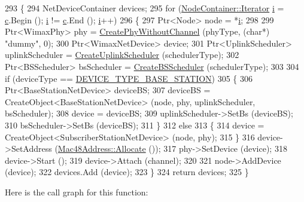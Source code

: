 \begin{DoxyCode}
293 \{
294   NetDeviceContainer devices;
295   \textcolor{keywordflow}{for} (\hyperlink{classns3_1_1NodeContainer_aa1a9f2d2b09bfef7d066d3974bca2cc4}{NodeContainer::Iterator} \hyperlink{bernuolliDistribution_8m_a6f6ccfcf58b31cb6412107d9d5281426}{i} = \hyperlink{lte_2model_2fading-traces_2fading__trace__generator_8m_ae0323a9039add2978bf5b49550572c7c}{c}.Begin (); \hyperlink{bernuolliDistribution_8m_a6f6ccfcf58b31cb6412107d9d5281426}{i} != \hyperlink{lte_2model_2fading-traces_2fading__trace__generator_8m_ae0323a9039add2978bf5b49550572c7c}{c}.End (); 
      \hyperlink{bernuolliDistribution_8m_a6f6ccfcf58b31cb6412107d9d5281426}{i}++)
296     \{
297       Ptr<Node> node = *\hyperlink{bernuolliDistribution_8m_a6f6ccfcf58b31cb6412107d9d5281426}{i};
298 
299       Ptr<WimaxPhy> phy = \hyperlink{classns3_1_1WimaxHelper_a2df0761a458376b6e2e1ad4ebb471697}{CreatePhyWithoutChannel} (phyType, (\textcolor{keywordtype}{char}*) \textcolor{stringliteral}{"dummy"}, 0);
300       Ptr<WimaxNetDevice> device;
301       Ptr<UplinkScheduler> uplinkScheduler = \hyperlink{classns3_1_1WimaxHelper_a3b237b459ffd98a13d71612d985f9e90}{CreateUplinkScheduler} (schedulerType);
302       Ptr<BSScheduler> bsScheduler = \hyperlink{classns3_1_1WimaxHelper_a583fc7ce6463c687092e9ef8d03413af}{CreateBSScheduler} (schedulerType);
303 
304       \textcolor{keywordflow}{if} (deviceType == \hyperlink{classns3_1_1WimaxHelper_a2c8fd9211cf4d7605e506b7c983d78fca96e5d9ff34a8a0da1262f37e83abc43b}{DEVICE\_TYPE\_BASE\_STATION})
305         \{
306           Ptr<BaseStationNetDevice> deviceBS;
307           deviceBS = CreateObject<BaseStationNetDevice> (node, phy, uplinkScheduler, bsScheduler);
308           device = deviceBS;
309           uplinkScheduler->SetBs (deviceBS);
310           bsScheduler->SetBs (deviceBS);
311         \}
312       \textcolor{keywordflow}{else}
313         \{
314           device = CreateObject<SubscriberStationNetDevice> (node, phy);
315         \}
316       device->SetAddress (\hyperlink{classns3_1_1Mac48Address_a203b53c035649c0d4881fa1115aa2cdb}{Mac48Address::Allocate} ());
317       phy->SetDevice (device);
318       device->Start ();
319       device->Attach (channel);
320 
321       node->AddDevice (device);
322       devices.Add (device);
323     \}
324   \textcolor{keywordflow}{return} devices;
325 \}
\end{DoxyCode}


Here is the call graph for this function\+:


